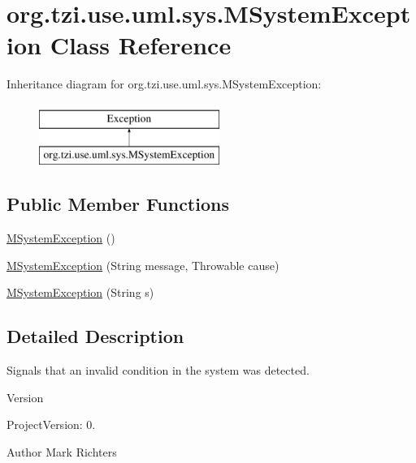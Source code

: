 \hypertarget{classorg_1_1tzi_1_1use_1_1uml_1_1sys_1_1_m_system_exception}{\section{org.\-tzi.\-use.\-uml.\-sys.\-M\-System\-Exception Class Reference}
\label{classorg_1_1tzi_1_1use_1_1uml_1_1sys_1_1_m_system_exception}
}
Inheritance diagram for org.\-tzi.\-use.\-uml.\-sys.\-M\-System\-Exception\-:\begin{figure}[H]
\begin{center}
\leavevmode
\includegraphics[height=2.000000cm]{classorg_1_1tzi_1_1use_1_1uml_1_1sys_1_1_m_system_exception}
\end{center}
\end{figure}
\subsection*{Public Member Functions}
\begin{DoxyCompactItemize}
\item 
\hyperlink{classorg_1_1tzi_1_1use_1_1uml_1_1sys_1_1_m_system_exception_a05eb3bdd06f036fdc1a0540991cf83b7}{M\-System\-Exception} ()
\item 
\hyperlink{classorg_1_1tzi_1_1use_1_1uml_1_1sys_1_1_m_system_exception_a445843edec7048c85f90098e76ecf5c6}{M\-System\-Exception} (String message, Throwable cause)
\item 
\hyperlink{classorg_1_1tzi_1_1use_1_1uml_1_1sys_1_1_m_system_exception_ae0165e0294d79ac085fd460effbf6edb}{M\-System\-Exception} (String s)
\end{DoxyCompactItemize}


\subsection{Detailed Description}
Signals that an invalid condition in the system was detected.

\begin{DoxyVersion}{Version}

\end{DoxyVersion}
\begin{DoxyParagraph}{Project\-Version\-:}
0. 
\end{DoxyParagraph}
\begin{DoxyAuthor}{Author}
Mark Richters 
\end{DoxyAuthor}


